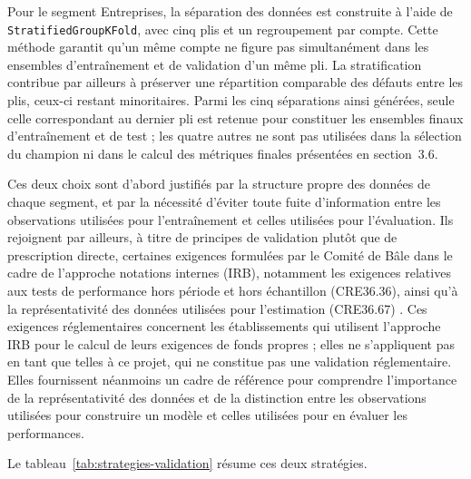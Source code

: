 Pour le segment Entreprises, la séparation des données est construite à l'aide de \texttt{StratifiedGroupKFold}, avec cinq plis et un regroupement par compte. Cette méthode garantit qu'un même compte ne figure pas simultanément dans les ensembles d'entraînement et de validation d'un même pli. La stratification contribue par ailleurs à préserver une répartition comparable des défauts entre les plis, ceux-ci restant minoritaires. Parmi les cinq séparations ainsi générées, seule celle correspondant au dernier pli est retenue pour constituer les ensembles finaux d'entraînement et de test ; les quatre autres ne sont pas utilisées dans la sélection du champion ni dans le calcul des métriques finales présentées en section~3.6.

Ces deux choix sont d'abord justifiés par la structure propre des données de chaque segment, et par la nécessité d'éviter toute fuite d'information entre les observations utilisées pour l'entraînement et celles utilisées pour l'évaluation. Ils rejoignent par ailleurs, à titre de principes de validation plutôt que de prescription directe, certaines exigences formulées par le Comité de Bâle dans le cadre de l'approche notations internes (IRB), notamment les exigences relatives aux tests de performance hors période et hors échantillon (CRE36.36), ainsi qu'à la représentativité des données utilisées pour l'estimation (CRE36.67) \parencite{BCBS_CRE36}. Ces exigences réglementaires concernent les établissements qui utilisent l'approche IRB pour le calcul de leurs exigences de fonds propres ; elles ne s'appliquent pas en tant que telles à ce projet, qui ne constitue pas une validation réglementaire. Elles fournissent néanmoins un cadre de référence pour comprendre l'importance de la représentativité des données et de la distinction entre les observations utilisées pour construire un modèle et celles utilisées pour en évaluer les performances.

Le tableau~\ref{tab:strategies-validation} résume ces deux stratégies.

